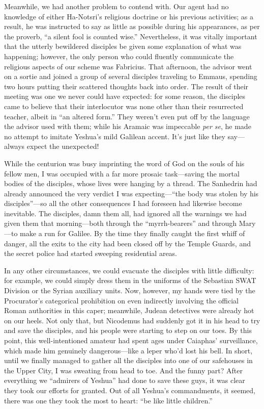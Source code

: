 Meanwhile, we had another problem to contend with. Our agent had no knowledge of either Ha-Notsri's religious doctrine or his previous activities; as a result, he was instructed to say as little as possible during his appearances, as per the proverb, ``a silent fool is counted wise.'' Nevertheless, it was vitally important that the utterly bewildered disciples be given some explanation of what was happening; however, the only person who could fluently communicate the religious aspects of our scheme was Fabricius. That afternoon, the advisor went on a sortie and joined a group of several disciples traveling to Emmaus, spending two hours putting their scattered thoughts back into order. The result of their meeting was one we never could have expected: for some reason, the disciples came to believe that their interlocutor was none other than their resurrected teacher, albeit in ``an altered form.'' They weren't even put off by the language the advisor used with them; while his Aramaic was impeccable \emph{per se}, he made no attempt to imitate Yeshua's mild Galilean accent. It's just like they say---always expect the unexpected!

While the centurion was busy imprinting the word of God on the souls of his fellow men, I was occupied with a far more prosaic task---saving the mortal bodies of the disciples, whose lives were hanging by a thread. The Sanhedrin had already announced the very verdict I was expecting---``the body was stolen by his disciples''---so all the other consequences I had foreseen had likewise become inevitable. The disciples, damn them all, had ignored all the warnings we had given them that morning---both through the ``myrrh-bearers'' and through Mary---to make a run for Galilee. By the time they finally caught the first whiff of danger, all the exits to the city had been closed off by the Temple Guards, and the secret police had started sweeping residential areas.

In any other circumstances, we could evacuate the disciples with little difficulty: for example, we could simply dress them in the uniforms of the Sebastian SWAT Division or the Syrian auxiliary units. Now, however, my hands were tied by the Procurator's categorical prohibition on even indirectly involving the official Roman authorities in this caper; meanwhile, Judean detectives were already hot on our heels. Not only that, but Nicodemus had suddenly got it in his head to try and save the disciples, and his people were starting to step on our toes. By this point, this well-intentioned amateur had spent ages under Caiaphas' surveillance, which made him genuinely dangerous---like a leper who'd lost his bell. In short, until we finally managed to gather all the disciples into one of our safehouses in the Upper City, I was sweating from head to toe. And the funny part? After everything we ``admirers of Yeshua'' had done to save these guys, it was clear they took our efforts for granted. Out of all Yeshua's commandments, it seemed, there was one they took the most to heart: ``be like little children.''

